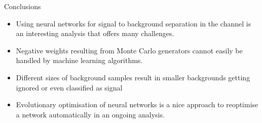 \begin{frame}{Conclusions}
    \begin{itemize}
        \item Using neural networks for signal to background separation in the \tHq channel is an interesting analysis that offers many challenges.
        \item Negative weights resulting from Monte Carlo generators cannot easily be handled by machine learning algorithms.
        \item Different sizes of background samples result in smaller backgrounds getting ignored or even classified as signal
        \item Evolutionary optimisation of neural networks is a nice approach to reoptimise a network automatically in an ongoing analysis.
    \end{itemize}
\end{frame}